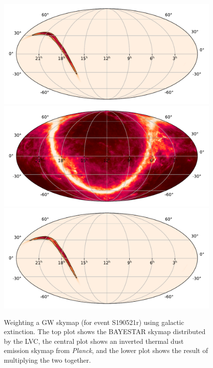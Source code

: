\begin{colsection}
\begin{colsection}
\begin{figure}[p]
    \begin{center}
        \includegraphics[width=0.8\linewidth]{images/tiling/ext_before.pdf}
        \includegraphics[width=0.8\linewidth]{images/tiling/ext.pdf}
        \includegraphics[width=0.8\linewidth]{images/tiling/ext_after.pdf}
    \end{center}
    \caption[Weighting a GW skymap using galactic extinction]{
        Weighting a GW skymap (for event S190521r) using galactic extinction. The top plot shows the BAYESTAR skymap distributed by the LVC, the central plot shows an inverted thermal dust emission skymap from \textit{Planck}, and the lower plot shows the result of multiplying the two together.
    }\label{fig:extinction_skymap}
\end{figure}

\end{colsection}


\end{colsection}

